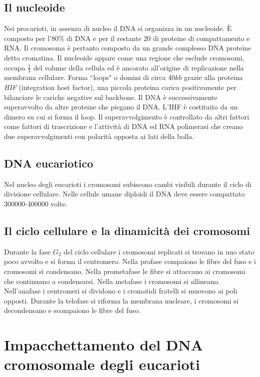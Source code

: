 \subsection{Il nucleoide}
Nei procarioti, in assenza di nucleo il DNA si organizza in un nucleoide. \`E composto per l'$80\%$ di DNA e per il restante $20$ di proteine di compattamento e RNA. Il cromosoma 
\`e pertanto composto da un grande complesso DNA proteine detto cromatina. Il nucleoide appare come una regione che esclude cromosomi, occupa $\frac{1}{3}$ del volume della cellula ed
\`e ancorato all'origine di replicazione nella membrana cellulare. Forma ``loops" o domini di circa $40kb$ grazie alla proteina \emph{HIF} (integration host factor), una piccola
proteina carica positivamente per bilanciare le cariche negative sul backbone. Il DNA \`e successivamente superavvolto da altre proteine che piegano il DNA. L'IHF \`e costituito da
un dimero su cui si forma il loop. Il superavvolgimento \`e controllato da altri fattori come fattori di trascrizione e l'attivit\`a di DNA ed RNA polimerasi che creano due
superavvolgimenti con polarit\`a opposta ai lati della bolla.
\subsection{DNA eucariotico}
Nel nucleo degli eucarioti i cromosomi subiscono cambi visibili durante il ciclo di divisione cellulare. Nelle cellule umane diploidi il DNA deve essere compattato 
\num{300000}-\num{400000} volte. 
\subsection{Il ciclo cellulare e la dinamicit\`a dei cromosomi}
Durante la fase $G_2$ del ciclo cellulare i cromosomi replicati si trovano in uno stato poco avvolto e si forma il centromero. Nella profase compaiono le fibre del fuso e i cromosomi
si condensano. Nella prometafase le fibre si attaccano ai cromosomi che continuano a condensarsi. Nella metafase i cromosomi si allineano. Nell'anafase i centromeri si dividono e
i cromatidi fratelli si muovono ai poli opposti. Durante la telofase si riforma la membrana nucleare, i cromosomi si decondensano e scompaiono le fibre del fuso. 
\section{Impacchettamento del DNA cromosomale degli eucarioti}
